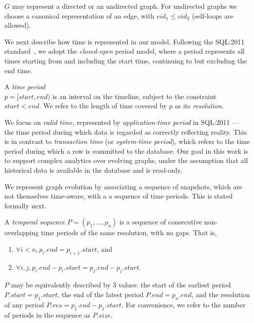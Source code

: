 $G$ may represent a directed or an undirected graph.  For undirected
graphs we choose a canonical representation of an edge, with $vid_1
\leq vid_2$ (self-loops are allowed).

We next describe how time is represented in our model.  Following the
SQL:2011 standard~\cite{DBLP:journals/sigmod/KulkarniM12}, we adopt
the {\em closed-open} period model, where a period represents all
times starting from and including the start time, continuing to but
excluding the end time.

\begin{definition}
\label{def:period} 
A {\em time period} \\$p = [start, end)$ is an interval on the timeline,
  subject to the constraint $start < end$.  We refer to the length of
  time covered by $p$ as its {\em resolution}.
\end{definition}

We focus on {\em valid time}, represented by {\em application-time
  period} in SQL:2011 --- the time period during which data is
regarded as correctly reflecting reality.  This is in contrast to {\em
  transaction time} (or {\em system-time period}), which refers to the
time period during which a row is committed to the database.  Our goal
in this work is to support complex analytics over evolving graphs,
under the assumption that all historical data is available in the
database and is read-only.

We represent graph evolution by associating a sequence of snapshots,
which are not themselves time-aware, with a a sequence of time
periods.  This is stated formally next.

\begin{definition} 
\label{def:tseq} 
A {\em temporal sequence} $P = (p_1, \ldots, p_n)$ is a
sequence of consecutive non-overlapping time periods of the same
resolution, with no gaps.  That is,

\begin{enumerate}
\item $\forall i < n, p_i.end = p_{i+1}.start$, and 
\item $\forall i, j, p_i.end - p_i.start = p_j.end - p_j.start$.
\end{enumerate}
\end{definition}

$P$ may be equivalently described by 3 values: the start of the
earliest period $P.start = p_1.start$, the end of the latest period
$P.end = p_n.end$, and the resolution of any period $P.res = p_1.end -
p_1.start$. For convenience, we refer to the number of periods in the
sequence as $P.size$.  

